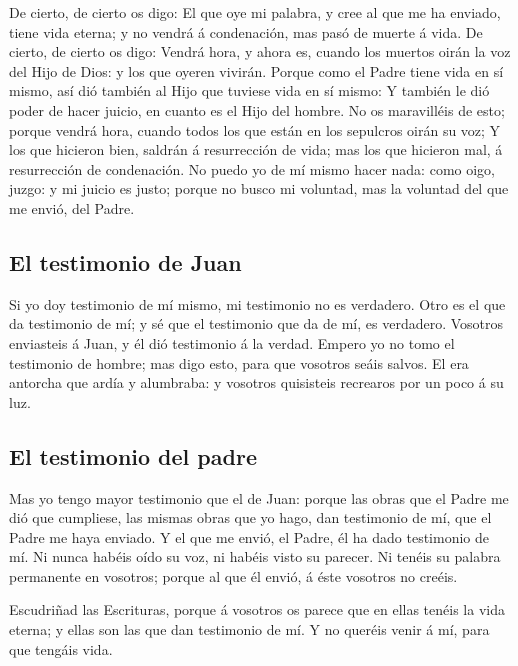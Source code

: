  De cierto, de cierto os digo: El que oye mi palabra, y
cree al que me ha enviado, tiene vida eterna; y no vendrá á condenación,
mas pasó de muerte á vida.  De cierto, de cierto os digo:
Vendrá hora, y ahora es, cuando los muertos oirán la voz del Hijo de
Dios: y los que oyeren vivirán.  Porque como el Padre tiene
vida en sí mismo, así dió también al Hijo que tuviese vida en sí mismo:
 Y también le dió poder de hacer juicio, en cuanto es el
Hijo del hombre.  No os maravilléis de esto; porque vendrá
hora, cuando todos los que están en los sepulcros oirán su voz;
 Y los que hicieron bien, saldrán á resurrección de vida;
mas los que hicieron mal, á resurrección de condenación. 
No puedo yo de mí mismo hacer nada: como oigo, juzgo: y mi juicio es
justo; porque no busco mi voluntad, mas la voluntad del que me envió,
del Padre.

\hypertarget{el-testimonio-de-juan}{%
\subsection{El testimonio de Juan}\label{el-testimonio-de-juan}}

 Si yo doy testimonio de mí mismo, mi testimonio no es
verdadero.  Otro es el que da testimonio de mí; y sé que el
testimonio que da de mí, es verdadero.  Vosotros enviasteis
á Juan, y él dió testimonio á la verdad.  Empero yo no tomo
el testimonio de hombre; mas digo esto, para que vosotros seáis salvos.
 El era antorcha que ardía y alumbraba: y vosotros
quisisteis recrearos por un poco á su luz.

\hypertarget{el-testimonio-del-padre}{%
\subsection{El testimonio del padre}\label{el-testimonio-del-padre}}

 Mas yo tengo mayor testimonio que el de Juan: porque las
obras que el Padre me dió que cumpliese, las mismas obras que yo hago,
dan testimonio de mí, que el Padre me haya enviado.  Y el
que me envió, el Padre, él ha dado testimonio de mí. Ni nunca habéis
oído su voz, ni habéis visto su parecer.  Ni tenéis su
palabra permanente en vosotros; porque al que él envió, á éste vosotros
no creéis.

 Escudriñad las Escrituras, porque á vosotros os parece que
en ellas tenéis la vida eterna; y ellas son las que dan testimonio de
mí.  Y no queréis venir á mí, para que tengáis vida.

